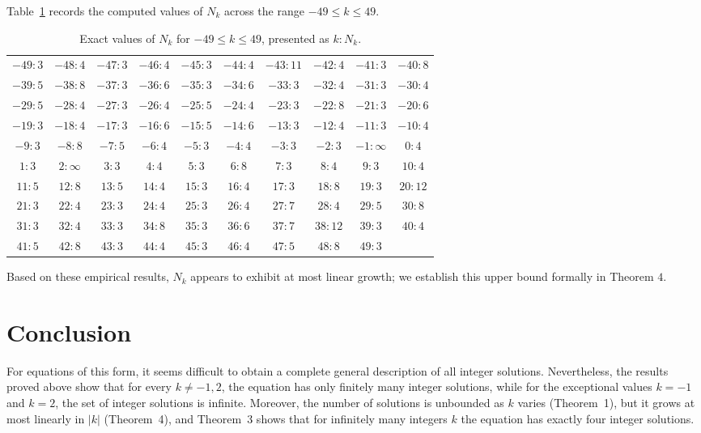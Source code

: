 \documentclass[a4paper,14pt]{extarticle}  %
\begin{document}
Table~\ref{tab:nk_compact} records the computed values of $N_k$ across the range $-49 \le k \le 49$.

\begin{table}[H]
\centering
\caption{Exact values of $N_k$ for $-49 \le k \le 49$, presented as $k : N_k$.}
\label{tab:nk_compact}
\small
\begin{tabular}{cccccccccc}
\toprule
$-49:3$ & $-48:4$ & $-47:3$ & $-46:4$ & $-45:3$ & $-44:4$ & $-43:11$ & $-42:4$ & $-41:3$ & $-40:8$ \\
$-39:5$ & $-38:8$ & $-37:3$ & $-36:6$ & $-35:3$ & $-34:6$ & $-33:3$ & $-32:4$ & $-31:3$ & $-30:4$ \\
$-29:5$ & $-28:4$ & $-27:3$ & $-26:4$ & $-25:5$ & $-24:4$ & $-23:3$ & $-22:8$ & $-21:3$ & $-20:6$ \\
$-19:3$ & $-18:4$ & $-17:3$ & $-16:6$ & $-15:5$ & $-14:6$ & $-13:3$ & $-12:4$ & $-11:3$ & $-10:4$ \\
$-9:3$  & $-8:8$  & $-7:5$  & $-6:4$  & $-5:3$  & $-4:4$  & $-3:3$   & $-2:3$  & $-1:\infty$ & $0:4$ \\
$1:3$   & $2:\infty$ & $3:3$  & $4:4$   & $5:3$   & $6:8$   & $7:3$    & $8:4$   & $9:3$   & $10:4$ \\
$11:5$  & $12:8$  & $13:5$  & $14:4$  & $15:3$  & $16:4$  & $17:3$   & $18:8$  & $19:3$  & $20:12$ \\
$21:3$  & $22:4$  & $23:3$  & $24:4$  & $25:3$  & $26:4$  & $27:7$   & $28:4$  & $29:5$  & $30:8$ \\
$31:3$  & $32:4$  & $33:3$  & $34:8$  & $35:3$  & $36:6$  & $37:7$   & $38:12$ & $39:3$  & $40:4$ \\
$41:5$  & $42:8$  & $43:3$  & $44:4$  & $45:3$  & $46:4$  & $47:5$   & $48:8$  & $49:3$  & \\
\bottomrule
\end{tabular}
\end{table}

Based on these empirical results, $N_k$ appears to exhibit at most linear growth; we establish this upper bound formally in Theorem $4$.
\newline






\section{Conclusion}
For equations of this form, it seems difficult to obtain a complete general description of all integer solutions. Nevertheless, the results proved above show that for every \(k\neq -1,2\), the equation has only finitely many integer solutions, while for the exceptional values \(k=-1\) and \(k=2\), the set of integer solutions is infinite. Moreover, the number of solutions is unbounded as \(k\) varies (Theorem~1), but it grows at most linearly in \(|k|\) (Theorem~4), and Theorem~3 shows that for infinitely many integers \(k\) the equation has exactly four integer solutions.
\end{document}

